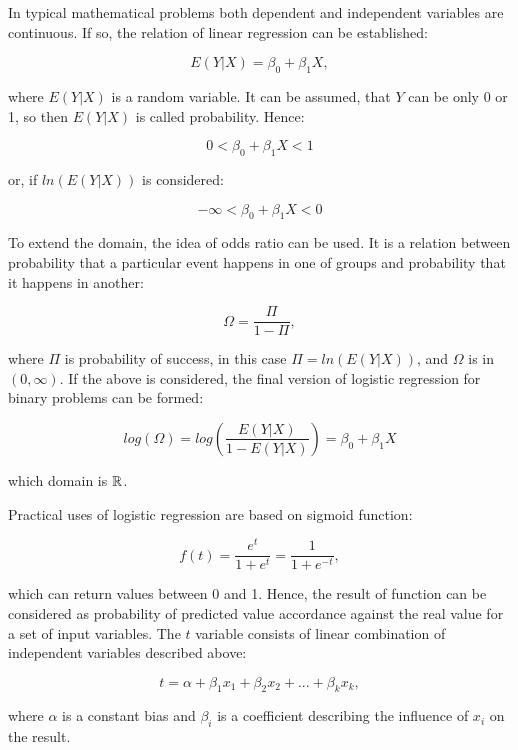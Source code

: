 \documentclass[energies,article,submit,pdftex,moreauthors]{Definitions/mdpi}
\begin{document}
In typical mathematical problems both dependent and independent variables are continuous. If so, the relation of linear regression can be established:
\begin{linenomath}
\begin{equation}
E(Y|X) = \beta_0 + \beta_1 X,
\end{equation}
\end{linenomath}
where $ E(Y|X) $ is a random variable. It can be assumed, that $ Y $ can be only 0 or 1, so then $ E(Y|X) $ is called probability. Hence:
\begin{linenomath}
\begin{equation}
0 < \beta_0 + \beta_1 X < 1
\end{equation}
\end{linenomath}
or, if $ ln(E(Y|X)) $ is considered:
\begin{linenomath}
\begin{equation}
-\infty < \beta_0 + \beta_1 X < 0
\end{equation}
\end{linenomath}
To extend the domain, the idea of odds ratio can be used. It is a relation between probability that a particular event happens in one of groups and probability that it happens in another:
\begin{linenomath}
\begin{equation}
\Omega = \frac{\Pi}{1-\Pi},
\end{equation}
\end{linenomath}
where $ \Pi $ is probability of success, in this case $ \Pi = ln(E(Y|X)) $, and $ \Omega $ is in $ (0, \infty)$. If the above is considered, the final version of logistic regression for binary problems can be formed:
\begin{linenomath}
\begin{equation}
log(\Omega) = log(\frac{E(Y|X)}{1 - E(Y|X)}) = \beta_0 + \beta_1 X
\end{equation}
\end{linenomath}
which domain is $ {\Bbb R} $.

\vspace{5mm}
Practical uses of logistic regression are based on sigmoid function:
\begin{linenomath}
\begin{equation}
f(t) = \frac{e^t}{1+e^t} = \frac{1}{1+e^{-t}},
\end{equation}
\end{linenomath}
which can return values between 0 and 1. Hence, the result of function can be considered as probability of predicted value accordance against the real value for a set of input variables. The $ t $ variable consists of linear combination of independent variables described above:
\begin{linenomath}
\begin{equation}
t = \alpha + \beta_1 x_1 + \beta_2 x_2 + ... + \beta_k x_k,
\end{equation}
\end{linenomath}
where $ \alpha $ is a constant bias and $ \beta_i $ is a coefficient describing the influence of $ x_i $ on the result.
\end{document}
